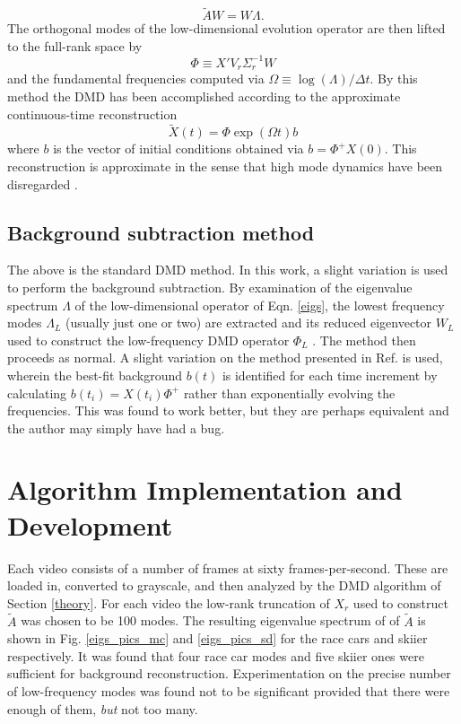 \documentclass{article}
\begin{document}
\begin{equation}
  \widetilde{A}W = W\Lambda.\label{eigs}
\end{equation}
The orthogonal modes of the low-dimensional evolution operator are then lifted to the full-rank space by
\begin{equation}
  \Phi \equiv X'V_r\Sigma_r^{-1}W
\end{equation}
and the fundamental frequencies computed via $\Omega \equiv \log(\Lambda)/\Delta t$. By this method the DMD has been accomplished according to the approximate continuous-time reconstruction
\begin{equation}
  \widetilde{X}(t) = \Phi\exp(\Omega t)b
\end{equation}
where $b$ is the vector of initial conditions obtained via $b = \Phi^+X(0)$. This reconstruction is approximate in the sense that high mode dynamics have been disregarded \cite{kutz_dmd}.

\subsection{Background subtraction method}\label{background}
The above is the standard DMD method. In this work, a slight variation is used to perform the background subtraction. By examination of the eigenvalue spectrum $\Lambda$ of the low-dimensional operator of Eqn. \ref{eigs}, the lowest frequency modes $\Lambda_L$ (usually just one or two) are extracted and its reduced eigenvector $W_L$ used to construct the low-frequency DMD operator $\Phi_L$ \cite{kutz_dmd}. The method then proceeds as normal. A slight variation on the method presented in Ref. \cite{kutz_dmd} is used, wherein the best-fit background $b(t)$ is identified for each time increment by calculating $b(t_i) = X(t_i)\Phi^+$ rather than exponentially evolving the frequencies. This was found to work better, but they are perhaps equivalent and the author may simply have had a bug.

\section{Algorithm Implementation and Development}\label{section}
Each video consists of a number of frames at sixty frames-per-second. These are loaded in, converted to grayscale, and then analyzed by the DMD algorithm of Section \ref{theory}. For each video the low-rank truncation of $X_r$ used to construct $\widetilde{A}$ was chosen to be 100 modes. The resulting eigenvalue spectrum of of $\widetilde{A}$ is shown in Fig. \ref{eigs_pics_mc} and \ref{eigs_pics_sd} for the race cars and skiier respectively. It was found that four race car modes and five skiier ones were sufficient for background reconstruction. Experimentation on the precise number of low-frequency modes was found not to be significant provided that there were enough of them, \textit{but} not too many.
\end{document}
